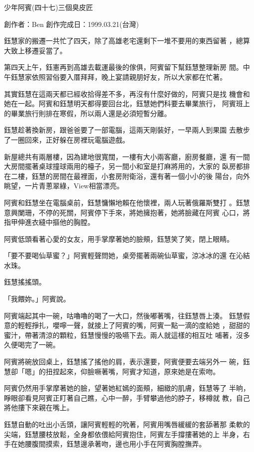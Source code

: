 



少年阿賓(四十七)三個臭皮匠

創作者：Ben
創作完成日：1999.03.21(台灣)


鈺慧家的搬遷一共忙了四天，除了高雄老宅還剩下一堆不要用的東西留著
，總算大致上移遷妥當了。

第四天上午，鈺憲再到高雄去載運最後的傢俱，阿賓留下幫鈺慧整理新房
間。中午鈺慧家依照習俗要入厝拜拜，晚上宴請親朋好友，所以大家都在忙著。

其實鈺慧在這兩天都已經收拾得差不多，再沒有什麼好做的，阿賓只是找
機會和她在一起。阿賓和鈺慧明天都得要回台北，鈺慧她們科要去畢業旅行，
阿賓班上的畢業旅行則排在寒假，所以兩人還是必須短暫分離。

鈺慧趁著換新房，跟爸爸要了一部電腦，這兩天剛裝好，一早兩人到果園
去散步了一圈回來，正好躲在房裡玩電腦遊戲。

新屋總共有兩層樓，因為建地很寬闊，一樓有大小兩客廳，廚房餐廳，還
有一間大房間擺著桌球撞球兩用的檯子，另一間小和室是打麻將用的，大家的
臥房都排在二樓，鈺慧的房間在最裡面，小套房附衛浴，還有著一個小小的後
陽台，向外眺望，一片青蔥翠綠，View相當漂亮。

阿賓和鈺慧坐在電腦桌前，鈺慧慵懶地賴在他懷裡，兩人玩著俄羅斯雙打
。鈺慧意興闌珊，不停的死關，阿賓停下手來，將她擁抱著，她將臉藏在阿賓
心口，將指甲伸進衣縫中摳他的胸膛。

阿賓低頭看著心愛的女友，用手掌摩著她的臉頰，鈺慧笑了笑，閉上眼睛。

「要不要喝仙草蜜？」阿賓輕聲問她，桌旁擺著兩碗仙草蜜，涼冰冰的還
在沁結水珠。

鈺慧搖搖頭。

「我餵妳。」阿賓說。

阿賓端起其中一碗，咕嚕嚕的喝了一大口，然後嘟著嘴，往鈺慧唇上湊。
鈺慧假意的輕輕掙扎，嚶嚀一聲，就接上了阿賓的嘴，阿賓一點一滴的度給她
，甜甜的蜜汁，帶著清涼的顆粒，鈺慧慢慢的吸嚥下去。兩人就這樣的相互吐
哺著，沒多久便喝完了一碗。

阿賓將碗放回桌上，鈺慧搖了搖他的肩，表示還要，阿賓便要去端另外一
碗，鈺慧卻「嗯」的扭捏起來，仰臉噘著嘴，阿賓才知道，原來她是在索吻。

阿賓仍然用手掌摩著她的臉，望著她紅嫣的面頰，細緻的肌膚，鈺慧等了
半晌，睜眼卻看見阿賓正盯著自己瞧，心中一醉，手臂攀過他的脖子，移樽就
教，自己將他摟下來親在嘴上。

鈺慧自動的吐出小舌頭，讓阿賓輕輕的吮著，阿賓用嘴唇緩緩的套舔著那
柔軟的尖端，鈺慧腰枝放鬆，全身都依偎給阿賓抱住，阿賓左手撐摟著她的上
半身，右手在她腰腹間摸索，鈺慧邊承著吻，邊也用小手在阿賓胸膛撫弄。

